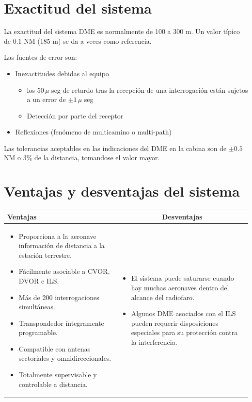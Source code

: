 \section{Exactitud del sistema}
\label{sec:DME.exactitud}

La exactitud del sistema DME es normalmente de 100 a 300 m. Un valor t\'ipico de $0.1$ NM (185 m) se da a veces como referencia. 

Las fuentes de error son:
\begin{itemize}
\item Inexactitudes debidas al equipo
  \begin{itemize}
  \item los $50\,\mu$ seg de retardo tras la recepci\'on de una interrogaci\'on
    est\'an sujetos a un error de $\pm 1\,\mu$ seg
  \item Detecci\'on por parte del receptor
  \end{itemize}
\item Reflexiones (fen\'omeno de   multicamino o multi-path)
\end{itemize}

Las tolerancias aceptables en las indicaciones del DME en la cabina son de $\pm 0.5$\,NM o 3\% de la distancia, tomandose el valor mayor.

\section{Ventajas y desventajas del sistema}
\label{sec:DME.ventajas.y.desventajas}

\begin{tabular}{|m{}|m{}|} \hline
	\centering \textbf{Ventajas} & 
	\multicolumn{1}{c|}{\textbf{Desventajas}} \\ \hline
  \begin{itemize}
  \item Proporciona a la aeronave informaci\'on de distancia a la
    estaci\'on terrestre.
  \item F\'acilmente asociable a CVOR, DVOR e ILS.
  \item M\'as de 200 interrogaciones simult\'aneas.
  \item Transpondedor \'integramente programable.
  \item Compatible con antenas sectoriales y omnidireccionales.
  \item Totalmente supervisable y controlable a distancia.
  \end{itemize}
	&
        \begin{itemize}
        \item El sistema puede saturarse cuando hay muchas aeronaves dentro del alcance del radiofaro. 
        \item 	Algunos DME asociados con el ILS pueden requerir disposiciones especiales para su protecci\'on contra la interferencia. 
        \end{itemize}
        \\ \hline
\end{tabular}




